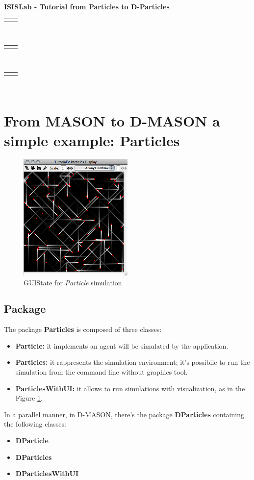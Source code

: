 \documentclass[12pt]{article}
\renewcommand{\title}[1]{\textbf{#1}\\}
\renewcommand{\line}{\begin{tabularx}{\textwidth}{X>{\raggedleft}X}\hline\\\end{tabularx}\\[-0.5cm]}
\newcommand{\leftright}[2]{\begin{tabularx}{\textwidth}{X>{\raggedleft}X}#1%
& #2\\\end{tabularx}\\[-0.5cm]}
\begin{document}
\title{ISISLab - Tutorial from Particles to D-Particles}
\line
\leftright{}{}
\leftright{}{}
\section{From MASON to D-MASON a simple example: Particles}
\begin{figure}[ht]
	\centering
		\includegraphics[width=0.5\textwidth]{particles.png}	
		\caption{GUIState for \textit{Particle} simulation}
	\label{fig:p01}
\end{figure}
\subsection{Package}
The package \textbf{Particles} is composed of three classes:
\begin{itemize}
\item \textbf{Particle:} it implements an agent will be simulated by the application.
\item \textbf{Particles:} it rappresents the simulation environment; it's possibile to run the simulation from the command line without graphics tool.
\item \textbf{ParticlesWithUI:} it allows to run simulations with visualization, as in the Figure \ref{fig:p01}.
\end{itemize}
In a parallel manner, in D-MASON, there's the package \textbf{DParticles} containing the following classes:
\begin{itemize}
\item \textbf{DParticle} 
\item \textbf{DParticles}
\item \textbf{DParticlesWithUI}
\end{itemize}
\end{document}
